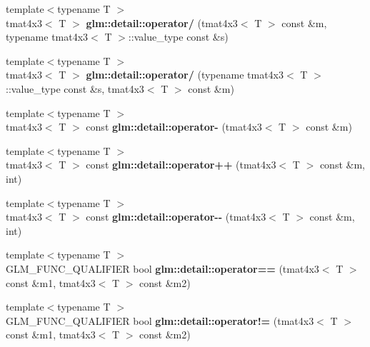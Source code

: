 \begin{DoxyCompactItemize}
\item 
\hypertarget{namespaceglm_1_1detail_ae8b2468e1a1c4c1e0923638b7feecd23}{{\footnotesize template$<$typename T $>$ }\\tmat4x3$<$ \-T $>$ {\bfseries glm\-::detail\-::operator/} (tmat4x3$<$ \-T $>$ const \&m, typename tmat4x3$<$ \-T $>$\-::value\-\_\-type const \&s)}\label{namespaceglm_1_1detail_ae8b2468e1a1c4c1e0923638b7feecd23}

\item 
\hypertarget{namespaceglm_1_1detail_ae88d1a9eda5524f94129301722151d6c}{{\footnotesize template$<$typename T $>$ }\\tmat4x3$<$ \-T $>$ {\bfseries glm\-::detail\-::operator/} (typename tmat4x3$<$ \-T $>$\-::value\-\_\-type const \&s, tmat4x3$<$ \-T $>$ const \&m)}\label{namespaceglm_1_1detail_ae88d1a9eda5524f94129301722151d6c}

\item 
\hypertarget{namespaceglm_1_1detail_a1f52ff9f222b82b50f538e83cd2a8bbf}{{\footnotesize template$<$typename T $>$ }\\tmat4x3$<$ \-T $>$ const {\bfseries glm\-::detail\-::operator-\/} (tmat4x3$<$ \-T $>$ const \&m)}\label{namespaceglm_1_1detail_a1f52ff9f222b82b50f538e83cd2a8bbf}

\item 
\hypertarget{namespaceglm_1_1detail_a2a3fa1bb9139c9893675a396b3bc84d5}{{\footnotesize template$<$typename T $>$ }\\tmat4x3$<$ \-T $>$ const {\bfseries glm\-::detail\-::operator++} (tmat4x3$<$ \-T $>$ const \&m, int)}\label{namespaceglm_1_1detail_a2a3fa1bb9139c9893675a396b3bc84d5}

\item 
\hypertarget{namespaceglm_1_1detail_ae7e69e058535806eb0670c882b20c393}{{\footnotesize template$<$typename T $>$ }\\tmat4x3$<$ \-T $>$ const {\bfseries glm\-::detail\-::operator-\/-\/} (tmat4x3$<$ \-T $>$ const \&m, int)}\label{namespaceglm_1_1detail_ae7e69e058535806eb0670c882b20c393}

\item 
\hypertarget{namespaceglm_1_1detail_a2a4ee64a78ceb64b6ad84b7bd5f7fc1f}{{\footnotesize template$<$typename T $>$ }\\\-G\-L\-M\-\_\-\-F\-U\-N\-C\-\_\-\-Q\-U\-A\-L\-I\-F\-I\-E\-R bool {\bfseries glm\-::detail\-::operator==} (tmat4x3$<$ \-T $>$ const \&m1, tmat4x3$<$ \-T $>$ const \&m2)}\label{namespaceglm_1_1detail_a2a4ee64a78ceb64b6ad84b7bd5f7fc1f}

\item 
\hypertarget{namespaceglm_1_1detail_aa2f6f4a87ab8f09da032bfa19b12c817}{{\footnotesize template$<$typename T $>$ }\\\-G\-L\-M\-\_\-\-F\-U\-N\-C\-\_\-\-Q\-U\-A\-L\-I\-F\-I\-E\-R bool {\bfseries glm\-::detail\-::operator!=} (tmat4x3$<$ \-T $>$ const \&m1, tmat4x3$<$ \-T $>$ const \&m2)}\label{namespaceglm_1_1detail_aa2f6f4a87ab8f09da032bfa19b12c817}

\end{DoxyCompactItemize}


